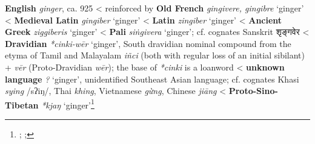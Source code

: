 \begin{etymology}\label{ety:ginger}
\textbf{English} \textit{ginger}, ca. 925
< reinforced by \textbf{Old French} \textit{gingivere, gingibre } `ginger'
< \textbf{Medieval Latin} \textit{gingiber} `ginger'
< \textbf{Latin} \textit{zingiber} `ginger'
< \textbf{Ancient Greek} {} \textit{ziggiberis} `ginger'
< \textbf{Pali} \textit{siṅgivera } `ginger'; cf. cognates Sanskrit शृङ्गवेर 
< \textbf{Dravidian} \textit{*cinki-wēr} `ginger', South dravidian nominal compound  from the etyma of Tamil and Malayalam \textit{iñci} (both with regular loss of an initial sibilant) + \textit{vēr} (Proto-Dravidian \textit{wēr}); the base of \textit{*cinki} is a loanword
< \textbf{unknown language} \textit{?} `ginger', unidentified Southeast Asian language; cf. cognates Khasi \textit{sying} /sʔiŋ/, Thai \textit{khing}, Vietnamese \textit{gừng}, Chinese \textit{jiāng}
< \textbf{Proto-Sino-Tibetan} \textit{*kjaŋ} `ginger'\footnote{\textcite{oed, ross_ginger_1952}; \textcite[5]{krishnamurti_dravidian_2003}; }
\end{etymology}